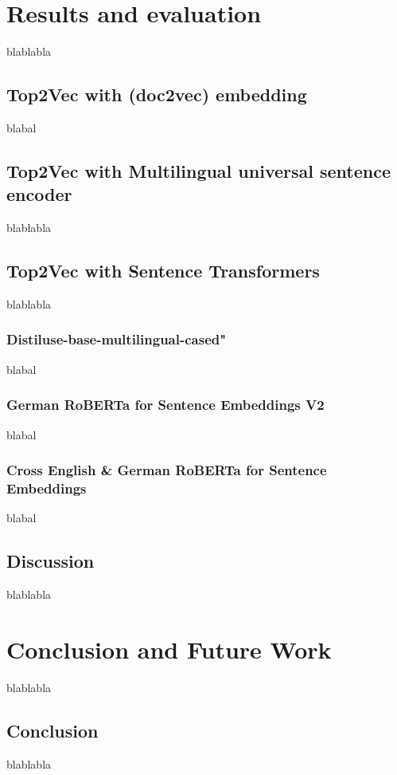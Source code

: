 \documentclass[fontsize=12pt,a4paper,twoside,openany]{scrbook}
\begin{document}
\chapter{Results and evaluation}

blablabla

\section{Top2Vec with (doc2vec) embedding}
\label{sec:doc2vec_results}
blabal

\section{Top2Vec with Multilingual universal sentence encoder}
\label{sec:muse_results}

blablabla

\section{Top2Vec with Sentence Transformers}
\label{sec:senttrans_results}
blablabla


\subsection{Distiluse-base-multilingual-cased"}
\label{sec:muse_result}
blabal


\subsection{German RoBERTa for Sentence Embeddings V2}
\label{sec:roberta_de_result}
blabal

\subsection{Cross English \& German RoBERTa for Sentence Embeddings}
\label{sec:roberta_de_en_result}
blabal

\section{Discussion}
\label{sec:discussion}
blablabla


\chapter{Conclusion and Future Work}
blablabla

\section{Conclusion}
blablabla
\end{document}
